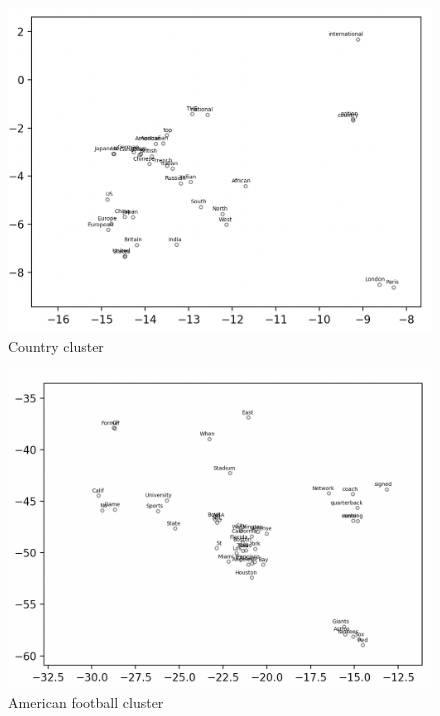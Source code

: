 \documentclass[12pt,article]{article}
\begin{document}
\begin{figure}[H]
    \centering
    \includegraphics[scale=0.6]{country.png} \par
    \caption{Country cluster}
    \label{fig:q2-country-cluster}
\end{figure}


\begin{figure}[H]
    \centering
    \includegraphics[scale=0.6]{american_football.png} \par
    \caption{American football cluster}
    \label{fig:q2-american-football}
\end{figure}
\end{document}
